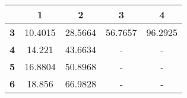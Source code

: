 \begin{tabular}{ | c | c | c | c | c | }
\hline
 & {\bf1} & {\bf2} & {\bf3} & {\bf4} \\ \hline
{\bf 3} & 10.4015 & 28.5664 & 56.7657 & 96.2925 \\ \hline
{\bf 4} & 14.221 & 43.6634 & - & - \\ \hline
{\bf 5} & 16.8804 & 50.8968 & - & - \\ \hline
{\bf 6} & 18.856 & 66.9828 & - & - \\ \hline
\end{tabular}